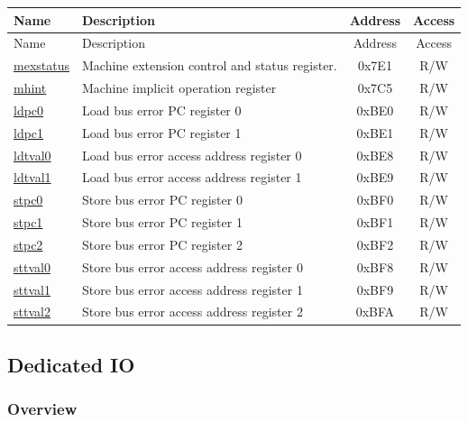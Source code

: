 \documentclass[main\_\_EN.tex]{subfiles}
\begin{document}
\begin{longtable}{ | p{4.0cm} | p{8.4cm} | c | c| }
\hline\rowcolor{lightgray}
Name & Description & Address & Access \\ \hline
\endfirsthead
\hline
\rowcolor{lightgray}
Name & Description & Address & Access  \\
\hline
\endhead
\endfoot

\hyperref[regdesc:MEXSTATUS]{mexstatus} & Machine extension control and status register. & 0x7E1 & R/W \\\hline
\hyperref[regdesc:MHINT]{mhint} & Machine implicit operation register & 0x7C5 & R/W \\\hline
\hyperref[regdesc:LDPC0]{ldpc0} & Load bus error PC register 0 & 0xBE0 & R/W \\\hline
\hyperref[regdesc:LDPC1]{ldpc1} & Load bus error PC register 1 & 0xBE1 & R/W \\\hline
\hyperref[regdesc:LDTVAL0]{ldtval0} & Load bus error access address register 0 & 0xBE8 & R/W \\\hline
\hyperref[regdesc:LDTVAL1]{ldtval1} & Load bus error access address register 1 & 0xBE9 & R/W \\\hline
\hyperref[regdesc:STPC0]{stpc0} & Store bus error PC register 0 & 0xBF0 & R/W \\\hline
\hyperref[regdesc:STPC1]{stpc1} & Store bus error PC register 1 & 0xBF1 & R/W \\\hline
\hyperref[regdesc:STPC2]{stpc2} & Store bus error PC register 2 & 0xBF2 & R/W \\\hline
\hyperref[regdesc:STTVAL0]{sttval0} & Store bus error access address register 0 & 0xBF8 & R/W \\\hline
\hyperref[regdesc:STTVAL1]{sttval1} & Store bus error access address register 1 & 0xBF9 & R/W \\\hline
\hyperref[regdesc:STTVAL2]{sttval2} & Store bus error access address register 2 & 0xBFA & R/W \\\hline
\end{longtable}

\newpage
\subsection{Dedicated IO}
\label{sec:riscvcpu-fastio}
\subsubsection{Overview}
\label{sec:riscvcpu-fastio-overview}
\end{document}
